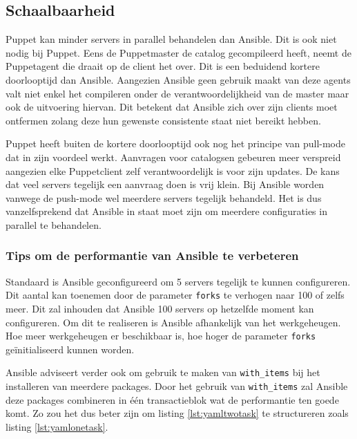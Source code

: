 \subsection{Schaalbaarheid}
\label{sec:schaalbaarheid}

Puppet kan minder servers  in parallel behandelen dan Ansible. Dit is ook niet nodig bij Puppet. Eens de Puppetmaster de \gls{catalog} gecompileerd heeft, neemt de Puppetagent die draait op de client het over. Dit is een beduidend kortere doorlooptijd dan Ansible. Aangezien Ansible geen gebruik maakt van deze agents valt niet enkel het compileren onder de verantwoordelijkheid van de master maar ook de uitvoering hiervan. Dit betekent dat Ansible zich over zijn clients moet ontfermen zolang deze hun gewenste consistente staat niet bereikt hebben.

Puppet heeft buiten de kortere doorlooptijd ook nog het principe van pull-mode dat in zijn voordeel werkt. Aanvragen voor \gls{catalog}sen gebeuren meer verspreid aangezien elke Puppetclient zelf verantwoordelijk is voor zijn updates. De kans dat veel servers tegelijk een aanvraag doen is vrij klein.  Bij Ansible worden vanwege de push-mode wel meerdere servers tegelijk behandeld. Het is dus vanzelfsprekend dat Ansible in staat moet zijn om meerdere configuraties in parallel te behandelen. 




 \subsubsection{Tips om de performantie van Ansible te verbeteren}
 
 Standaard is Ansible geconfigureerd om 5 servers tegelijk te kunnen configureren. Dit aantal kan toenemen door de parameter \texttt{\gls{fork}s} te verhogen naar 100 of zelfs meer. Dit zal inhouden dat Ansible 100 servers op hetzelfde moment kan configureren. Om dit te realiseren is Ansible afhankelijk van het werkgeheugen. Hoe meer werkgeheugen er beschikbaar is, hoe hoger de parameter \texttt{\gls{fork}s} ge\"initialiseerd kunnen worden.
 
Ansible adviseert verder ook om gebruik te maken van \texttt{with\_items} bij het installeren van meerdere packages. Door het gebruik van \texttt{with\_items} zal Ansible deze packages combineren in \'e\'en transactieblok wat de performantie ten goede komt. Zo zou het dus beter zijn om listing \ref{lst:yamltwotask} te structureren zoals listing \ref{lst:yamlonetask}. 


